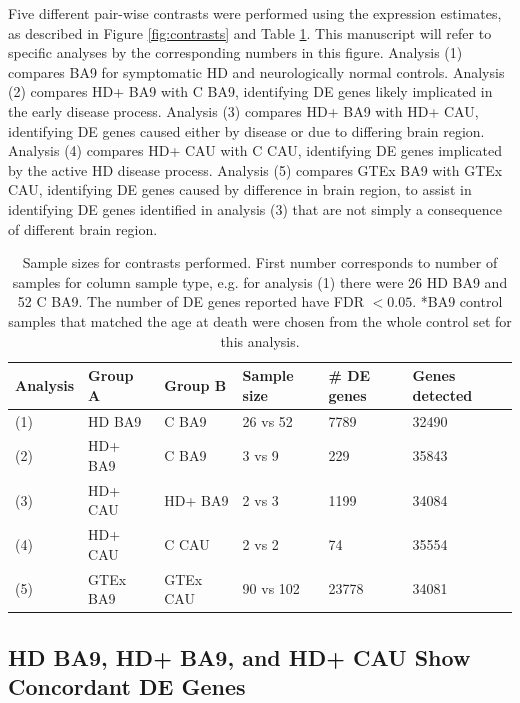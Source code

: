 \documentclass[fleqn,10pt,table]{wlscirep}
\begin{document}
Five different pair-wise contrasts were performed using the expression estimates, as described in Figure \ref{fig:contrasts} and Table \ref{tab:contrasts}.
This manuscript will refer to specific analyses by the corresponding numbers in this figure.
Analysis (1) compares BA9 for symptomatic HD and neurologically normal controls.
Analysis (2) compares HD+ BA9 with C BA9, identifying DE genes likely implicated in the early disease process.
Analysis (3) compares HD+ BA9 with HD+ CAU, identifying DE genes caused either by disease or due to differing brain region.
Analysis (4) compares HD+ CAU with C CAU, identifying DE genes implicated by the active HD disease process.
Analysis (5) compares GTEx BA9 with GTEx CAU, identifying DE genes caused by difference in brain region, to assist in identifying DE genes identified in analysis (3) that are not simply a consequence of different brain region.

\begin{table}[ht]
\centering
{}
\begin{tabular}{|l|l|l|l|l|l|} \hline
Analysis & Group A & Group B & Sample size & \# DE genes & Genes detected \\ \hline
(1) & HD BA9 & C BA9 & 26 vs 52 & 7789 & 32490 \\ \hline
(2) & HD+ BA9 & C BA9 & 3 vs 9 & 229 & 35843 \\ \hline
(3) & HD+ CAU & HD+ BA9 & 2 vs 3 & 1199 & 34084 \\ \hline
(4) & HD+ CAU & C CAU & 2 vs 2 & 74 & 35554 \\ \hline
(5) & GTEx BA9 & GTEx CAU & 90 vs 102 & 23778 & 34081 \\ \hline
\end{tabular}
\caption{
Sample sizes for contrasts performed.
First number corresponds to number of samples for column sample type, e.g. for analysis (1) there were 26 HD BA9 and 52 C BA9.
The number of DE genes reported have FDR $< 0.05$.
*BA9 control samples that matched the age at death were chosen from the whole control set for this analysis.
\label{tab:contrasts}}
\end{table}

\subsection{HD BA9, HD+ BA9, and HD+ CAU Show Concordant DE Genes}
\end{document}
